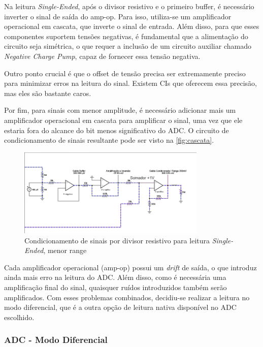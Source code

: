 Na leitura \textit{Single-Ended}, após o divisor resistivo e o primeiro buffer, é necessário inverter o sinal de saída do \gls{amp-op}. Para isso, utiliza-se um amplificador operacional em cascata, que inverte o sinal de entrada. Além disso, para que esses componentes suportem tensões negativas, é fundamental que a alimentação do circuito seja simétrica, o que requer a inclusão de um circuito auxiliar chamado \textit{Negative Charge Pump}, capaz de fornecer essa tensão negativa.

Outro ponto crucial é que o offset de tensão precisa ser extremamente preciso para minimizar erros na leitura do sinal. Existem \gls{CI}s que oferecem essa precisão, mas eles são bastante caros.

Por fim, para sinais com menor amplitude, é necessário adicionar mais um amplificador operacional em cascata para amplificar o sinal, uma vez que ele estaria fora do alcance do bit menos significativo do \gls{ADC}. O circuito de condicionamento de sinais resultante pode ser visto na \autoref{fig:cascata}.

\begin{figure}[htb!]
    \caption{Condicionamento de sinais por divisor resistivo para leitura \textit{Single-Ended}, menor range}
    \label{fig:cascata}
    \includegraphics[width=0.8\textwidth]{figuras/cascata.png}
    \fonte{}
\end{figure}

Cada amplificador operacional (amp-op) possui um \textit{drift} de saída, o que introduz ainda mais erro na leitura do \gls{ADC}. Além disso, como é necessária uma amplificação final do sinal, quaisquer ruídos introduzidos também serão amplificados. Com esses problemas combinados, decidiu-se realizar a leitura no modo diferencial, que é a outra opção de leitura nativa disponível no \gls{ADC} escolhido.

\subsubsection{ADC - Modo Diferencial}\label{modo-diferencial}

